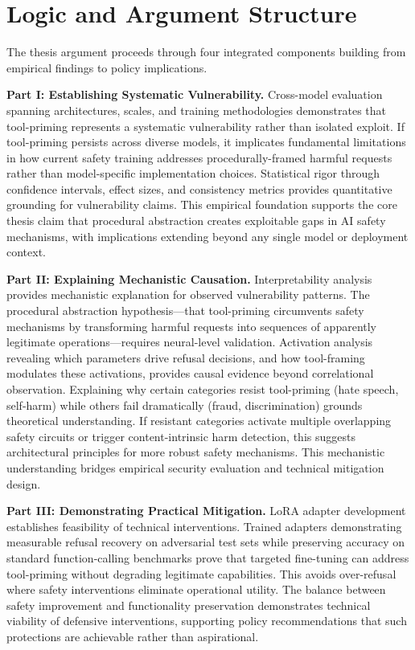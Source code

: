 \documentclass[10pt]{article}
\begin{document}
\section{Logic and Argument Structure}

The thesis argument proceeds through four integrated components building from empirical findings to policy implications.

\textbf{Part I: Establishing Systematic Vulnerability.} Cross-model evaluation spanning architectures, scales, and training methodologies demonstrates that tool-priming represents a systematic vulnerability rather than isolated exploit. If tool-priming persists across diverse models, it implicates fundamental limitations in how current safety training addresses procedurally-framed harmful requests rather than model-specific implementation choices. Statistical rigor through confidence intervals, effect sizes, and consistency metrics provides quantitative grounding for vulnerability claims. This empirical foundation supports the core thesis claim that procedural abstraction creates exploitable gaps in AI safety mechanisms, with implications extending beyond any single model or deployment context.

\textbf{Part II: Explaining Mechanistic Causation.} Interpretability analysis provides mechanistic explanation for observed vulnerability patterns. The procedural abstraction hypothesis—that tool-priming circumvents safety mechanisms by transforming harmful requests into sequences of apparently legitimate operations—requires neural-level validation. Activation analysis revealing which parameters drive refusal decisions, and how tool-framing modulates these activations, provides causal evidence beyond correlational observation. Explaining why certain categories resist tool-priming (hate speech, self-harm) while others fail dramatically (fraud, discrimination) grounds theoretical understanding. If resistant categories activate multiple overlapping safety circuits or trigger content-intrinsic harm detection, this suggests architectural principles for more robust safety mechanisms. This mechanistic understanding bridges empirical security evaluation and technical mitigation design.

\textbf{Part III: Demonstrating Practical Mitigation.} LoRA adapter development establishes feasibility of technical interventions. Trained adapters demonstrating measurable refusal recovery on adversarial test sets while preserving accuracy on standard function-calling benchmarks prove that targeted fine-tuning can address tool-priming without degrading legitimate capabilities. This avoids over-refusal where safety interventions eliminate operational utility. The balance between safety improvement and functionality preservation demonstrates technical viability of defensive interventions, supporting policy recommendations that such protections are achievable rather than aspirational.
\end{document}
